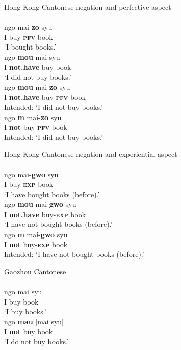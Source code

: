 \documentclass[output=paper,colorlinks,citecolor=brown,chinesefont]{langscibook}
\begin{document}
\ea Hong Kong Cantonese negation and perfective aspect \label{ex:lam5}\\
   \label{ex:lam5a}\\
    \gll ngo mai-\textbf{zo} syu\\
	I buy-\textbf{\textsc{pfv}} book\\
	\glt `I bought books.'
   \label{ex:lam5b}\\
    \gll ngo \textbf{mou} mai syu\\
	I \textbf{not.have} buy book\\
	\glt `I did not buy books.'
   \label{ex:lam5c}\\
  	\gll *ngo \textbf{mou} mai-\textbf{zo} syu\\
	I \textbf{not.have} buy-\textbf{\textsc{pfv}} book\\
	\glt Intended: `I did not buy books.'
   \label{ex:lam5d}\\
  	\gll *ngo \textbf{m} mai-\textbf{zo} syu\\
  	I \textbf{not} buy-\textbf{\textsc{pfv}} book\\
  	\glt Intended: `I did not buy books.'
\z \z


\ea Hong Kong Cantonese negation and experiential aspect \label{ex:lam6}\\
   \label{ex:lam6a}\\
  	\gll ngo mai-\textbf{gwo} syu\\
	I buy-\textbf{\textsc{exp}} book\\
	\glt `I have bought books (before).'
   \label{ex:lam6b}\\
  	\gll ngo \textbf{mou} mai-\textbf{gwo} syu \\
  	I \textbf{not.have} buy-\textbf{\textsc{exp}} book\\
  	\glt `I have not bought books (before).'
   \label{ex:lam6c}\\
	\gll *ngo \textbf{m} mai-\textbf{gwo} syu\\
  	I \textbf{not} buy-\textbf{\textsc{exp}} book\\
	\glt Intended: `I have not bought books (before).'
\z\z


\ea Gaozhou Cantonese \label{ex:lam7}\\
   \label{ex:lam7a}\\
  	\gll ngo	mai	syu\\
  	I buy book\\
	\glt `I buy books.'
   \label{ex:lam7b}\\
  	\gll ngo \textbf{mau} [mai syu]\\
  	I \textbf{not} buy book\\
  	\glt `I do not buy books.'
\z\z
\end{document}
